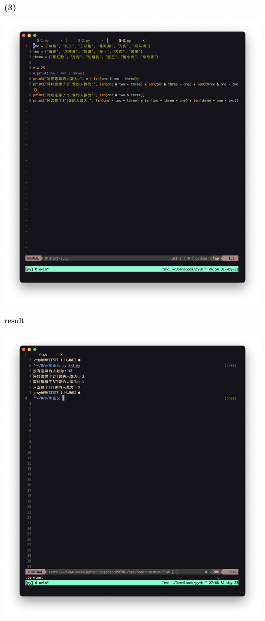\documentclass{beamer}
\begin{document}
  \begin{frame}[fragile]
    \frametitle{(3)}
    \centering
    \includegraphics[width=\textwidth,height=0.8\textheight]{graph/5-3.png}
  \end{frame}
  \begin{frame}[fragile]
    \framesubtitle{result}
    \centering
    \includegraphics[width=\textwidth,height=0.8\textheight]{graph/_5-3.png}
  \end{frame}
  
\end{document}
